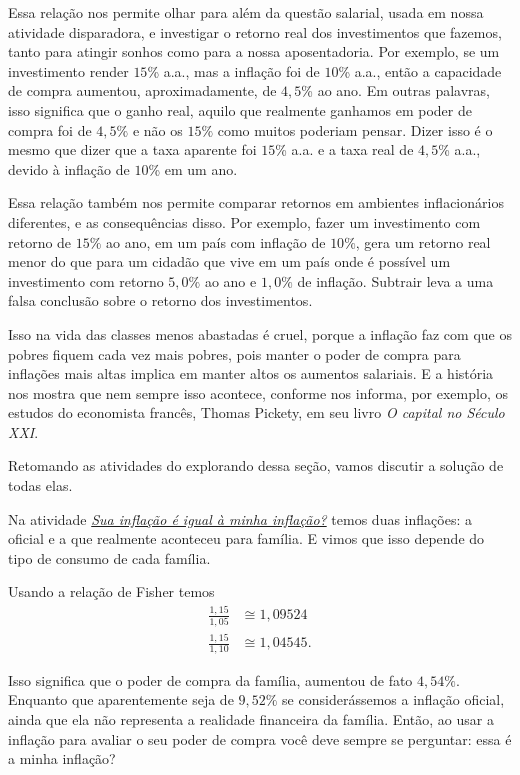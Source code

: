 Essa relação nos permite olhar para além da questão salarial, usada em nossa atividade disparadora, e investigar o retorno real dos investimentos que fazemos, tanto para atingir sonhos como para a nossa aposentadoria. Por exemplo, se um investimento render $15$\% a.a., mas a inflação foi de $10$\% a.a., então a capacidade de compra aumentou, aproximadamente, de $4{,}5$\% ao ano. Em outras palavras, isso significa que o ganho real, aquilo que realmente ganhamos em poder de compra foi de $4{,}5\%$ e não os $15\%$ como muitos poderiam pensar. Dizer isso é o mesmo que dizer que a taxa aparente foi $15$\% a.a. e a taxa real de $4{,}5$\% a.a., devido à inflação de $10$\% em um ano.

Essa relação também nos permite comparar retornos em ambientes inflacionários diferentes, e as consequências disso. Por exemplo, fazer um investimento com retorno de $15\%$ ao ano, em um país com inflação de $10\%$, gera um retorno real menor do que para um cidadão que vive em um país onde é possível um investimento com retorno $5{,}0\%$ ao ano e $1{,}0\%$ de inflação. Subtrair leva a uma falsa conclusão sobre o retorno dos investimentos. 

Isso na vida das classes menos abastadas é cruel, porque a inflação faz com que os pobres fiquem cada vez mais pobres, pois manter o poder de compra para inflações mais altas implica em manter altos os aumentos salariais. E a história nos mostra que nem sempre isso acontece, conforme nos informa, por exemplo, os estudos do economista francês, Thomas Pickety, em seu livro \textit{O capital no Século XXI}.

Retomando as atividades do explorando dessa seção, vamos discutir a solução de todas elas.

Na atividade \hyperref[fin-ativ-30]{\textit{Sua inflação é igual à minha inflação?}} temos duas inflações: a oficial e a que realmente aconteceu para família. E vimos que isso depende do tipo de consumo de cada família. 

Usando a relação de Fisher temos
\begin{align*}
\frac{1{,}15}{1{,}05}&\cong1{,}09524\\
\frac{1{,}15}{1{,}10}&\cong1{,}04545.
\end{align*}

Isso significa que o poder de compra da família, aumentou de fato $4{,}54\%$. Enquanto que aparentemente seja de $9{,}52\%$ se considerássemos a inflação oficial, ainda que ela não representa a realidade financeira da família. Então, ao usar a inflação para avaliar o seu poder de compra você deve sempre se perguntar: essa é a minha inflação? 

